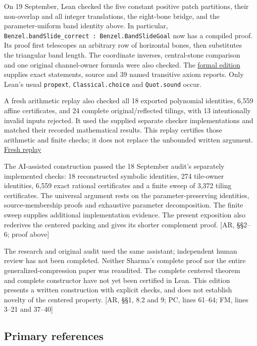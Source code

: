 \documentclass[
  11pt,
]{article}
\begin{document}
On 19 September, Lean checked the five constant positive patch
partitions, their non-overlap and all integer translations, the
eight-bone bridge, and the parameter-uniform band identity above. In
particular, \texttt{Benzel.bandSlide\_correct\ :\ Benzel.BandSlideGoal}
now has a compiled proof. Its proof first telescopes an arbitrary row of
horizontal bones, then substitutes the triangular band length. The
coordinate inverses, central-stone comparison and one original
channel-owner formula were also checked. The
\href{https://github.com/KokunoYumeto/benzel-workbench/blob/main/validation/20260919/lean-checked/README.md}{formal
edition} supplies exact statements, source and 39 named transitive axiom
reports. Only Lean's usual \texttt{propext}, \texttt{Classical.choice}
and \texttt{Quot.sound} occur.

A fresh arithmetic replay also checked all 18 exported polynomial
identities, 6,559 affine certificates, and 24 complete
original/reflected tilings, with 13 intentionally invalid inputs
rejected. It used the supplied separate checker implementations and
matched their recorded mathematical results. This replay certifies those
arithmetic and finite checks; it does not replace the unbounded written
argument.
\href{https://github.com/KokunoYumeto/benzel-workbench/blob/main/validation/20260919/fresh-replay/REPLAY.md}{Fresh
replay}

The AI-assisted construction passed the 18 September audit's separately
implemented checks: 18 reconstructed symbolic identities, 274 tile-owner
identities, 6,559 exact rational certificates and a finite sweep of
3,372 tiling certificates. The universal argument rests on the
parameter-preserving identities, source-membership proofs and exhaustive
parameter decomposition. The finite sweep supplies additional
implementation evidence. The present exposition also rederives the
centered packing and gives its shorter complement proof. {[}AR, §§2--6;
proof above{]}

The research and original audit used the same assistant; independent
human review has not been completed. Neither Sharma's complete proof nor
the entire generalized-compression paper was reaudited. The complete
centered theorem and complete constructor have not yet been certified in
Lean. This edition presents a written construction with explicit checks,
and does not establish novelty of the centered property. {[}AR, §§1, 8.2
and 9; PC, lines 61--64; FM, lines 3--21 and 37--40{]}

\subsection{Primary references}\label{primary-references}
\end{document}
